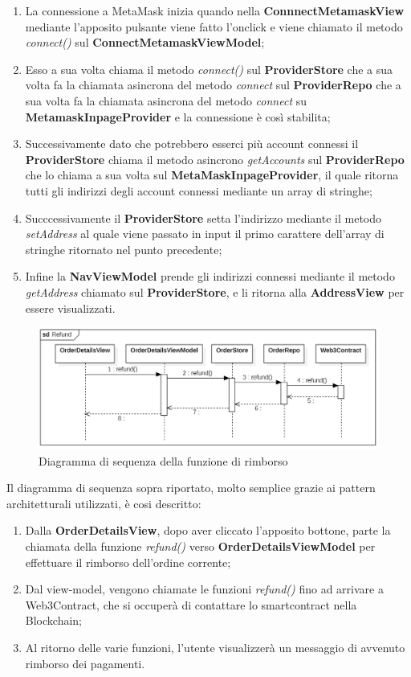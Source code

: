 \begin{enumerate}
    \item La connessione a MetaMask inizia quando nella \textbf{ConnnectMetamaskView} mediante l'apposito pulsante viene fatto l'onclick e viene chiamato il metodo \textit{connect()} sul \textbf{ConnectMetamaskViewModel};
    \item Esso a sua volta chiama il metodo \textit{connect()} sul \textbf{ProviderStore} che a sua volta fa la chiamata asincrona del metodo \textit{connect} sul \textbf{ProviderRepo} che a sua volta fa la chiamata asincrona del metodo \textit{connect} su \textbf{MetamaskInpageProvider} e la connessione è così stabilita;
    \item Successivamente dato che potrebbero esserci più account connessi il \textbf{ProviderStore} chiama il metodo asincrono \textit{getAccounts} sul \textbf{ProviderRepo} che lo chiama a sua volta sul \textbf{MetaMaskInpageProvider}, il quale ritorna tutti gli indirizzi degli account connessi mediante un array di stringhe;
    \item Succcessivamente il \textbf{ProviderStore} setta l'indirizzo mediante il metodo \textit{setAddress} al quale viene passato in input il primo carattere dell'array di stringhe ritornato nel punto precedente;
    \item Infine la \textbf{NavViewModel} prende gli indirizzi connessi mediante il metodo \textit{getAddress} chiamato sul \textbf{ProviderStore}, e li ritorna alla \textbf{AddressView} per essere visualizzati.
\end{enumerate}

\begin{figure}[H]
    \centering
    \includegraphics[scale = 0.6]{immagini/refund.png}
    \caption{Diagramma di sequenza della funzione di rimborso}
\end{figure}

Il diagramma di sequenza sopra riportato, molto semplice grazie ai pattern architetturali utilizzati, è cosi descritto:

\begin{enumerate}
    \item Dalla \textbf{OrderDetailsView}, dopo aver cliccato l'apposito bottone, parte la chiamata della funzione \textit{refund()} verso \textbf{OrderDetailsViewModel} per effettuare il rimborso dell'ordine corrente;
    \item Dal view-model, vengono chiamate le funzioni \textit{refund()} fino ad arrivare a Web3Contract, che si occuperà di contattare lo smartcontract nella Blockchain;
    \item Al ritorno delle varie funzioni, l'utente visualizzerà un messaggio di avvenuto rimborso dei pagamenti.
\end{enumerate}

